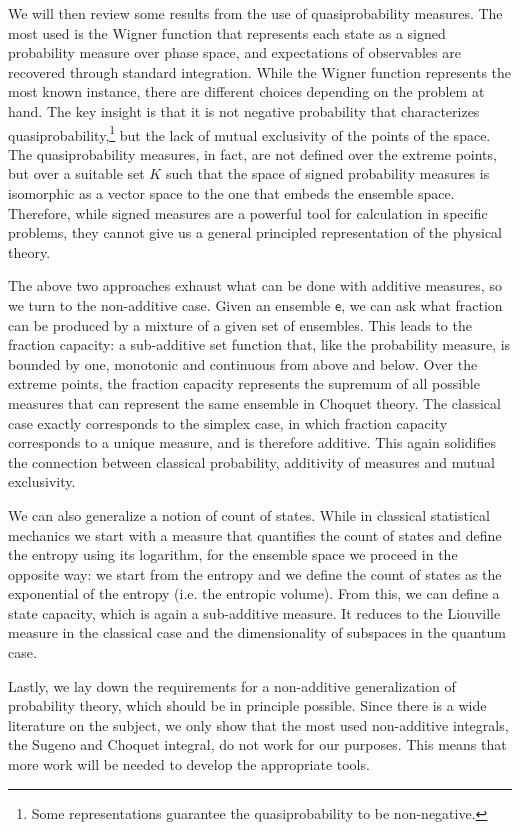 \documentclass[10pt,twocolumn, nofootinbib]{revtex4-2}
\newcommand{\ens}[1][e] {\mathsf{#1}} %
\begin{document}
We will then review some results from the use of quasiprobability measures. The most used is the Wigner function \cite{mandel1995} that represents each state as a signed probability measure over phase space, and expectations of observables are recovered through standard integration. While the Wigner function represents the most known instance, there are different choices depending on the problem at hand\cite{cahill1969}. The key insight is that it is not negative probability that characterizes quasiprobability,\footnote{Some representations guarantee the quasiprobability to be non-negative.} but the lack of mutual exclusivity of the points of the space. The quasiprobability measures, in fact, are not defined over the extreme points, but over a suitable set $K$ such that the space of signed probability measures is isomorphic as a vector space to the one that embeds the ensemble space. Therefore, while signed measures are a powerful tool for calculation in specific problems, they cannot give us a general principled representation of the physical theory.

The above two approaches exhaust what can be done with additive measures, so we turn to the non-additive case. Given an ensemble $\ens$, we can ask what fraction can be produced by a mixture of a given set of ensembles. This leads to the fraction capacity: a sub-additive set function that, like the probability measure, is bounded by one, monotonic and continuous from above and below. Over the extreme points, the fraction capacity represents the supremum of all possible measures that can represent the same ensemble in Choquet theory. The classical case exactly corresponds to the simplex case, in which fraction capacity corresponds to a unique measure, and is therefore additive. This again solidifies the connection between classical probability, additivity of measures and mutual exclusivity.

We can also generalize a notion of count of states. While in classical statistical mechanics we start with a measure that quantifies the count of states and define the entropy using its logarithm, for the ensemble space we proceed in the opposite way: we start from the entropy and we define the count of states as the exponential of the entropy (i.e. the entropic volume)\cite{hall1999}. From this, we can define a state capacity, which is again a sub-additive measure. It reduces to the Liouville measure in the classical case and the dimensionality of subspaces in the quantum case.

Lastly, we lay down the requirements for a non-additive generalization of probability theory, which should be in principle possible. Since there is a wide literature on the subject, \cite{pap2010,pap2013,nonadditive2014,grabisch2016} we only show that the most used non-additive integrals, the Sugeno and Choquet integral, do not work for our purposes. This means that more work will be needed to develop the appropriate tools.
\end{document}
